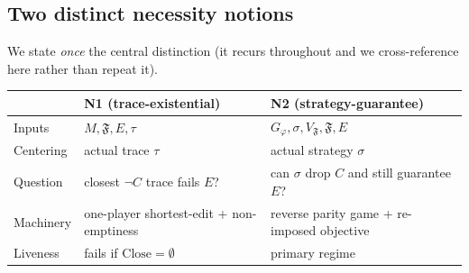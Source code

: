 \documentclass[11pt]{article}
\theoremstyle{remark}
\newcommand{\Close}{\mathrm{Close}}
\newcommand{\Frame}{\mathfrak{F}}
\begin{document}
\subsection{Two distinct necessity notions}
\label{sec:two-notions}

We state \emph{once} the central distinction (it recurs throughout and we
cross-reference here rather than repeat it).

\begin{center}
\small
\begin{tabular}{@{}l|l|l@{}}
\hline
 & \textbf{N1 (trace-existential)} & \textbf{N2 (strategy-guarantee)} \\
\hline
Inputs & \(M,\Frame,E,\tau\) & \(G_\varphi,\sigma,V_{\Frame},\Frame,E\) \\
Centering & actual trace \(\tau\) & actual strategy \(\sigma\) \\
Question & closest \(\neg C\) trace fails \(E\)? &
  can \(\sigma\) drop \(C\) and still guarantee \(E\)? \\
Machinery & one-player shortest-edit + non-emptiness &
  reverse parity game + re-imposed objective \\
Liveness & fails if \(\Close=\emptyset\) & primary regime \\
\hline
\end{tabular}
\end{center}
\end{document}
